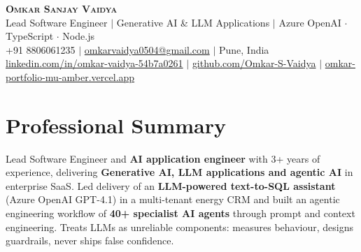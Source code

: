 \documentclass[letterpaper,10pt]{article}
\begin{document}
\begin{center}
\textbf{\Huge \scshape Omkar Sanjay Vaidya} \\ \vspace{2pt}
\large Lead Software Engineer $|$ Generative AI \& LLM Applications $|$ Azure OpenAI $\cdot$ TypeScript $\cdot$ Node.js \\ \vspace{2pt}
\small +91 8806061235 $|$
\href{mailto:omkarvaidya0504@gmail.com}{omkarvaidya0504@gmail.com} $|$
Pune, India \\
\href{https://www.linkedin.com/in/omkar-vaidya-54b7a0261/}{linkedin.com/in/omkar-vaidya-54b7a0261} $|$
\href{https://github.com/Omkar-S-Vaidya}{github.com/Omkar-S-Vaidya} $|$
\href{https://omkar-portfolio-mu-amber.vercel.app/}{omkar-portfolio-mu-amber.vercel.app}
\end{center}

\section{Professional Summary}
\small{Lead Software Engineer and \textbf{AI application engineer} with 3+ years of experience, delivering \textbf{Generative AI, LLM applications and agentic AI} in enterprise SaaS. Led delivery of an \textbf{LLM-powered text-to-SQL assistant} (Azure OpenAI GPT-4.1) in a multi-tenant energy CRM and built an agentic engineering workflow of \textbf{40+ specialist AI agents} through prompt and context engineering. Treats LLMs as unreliable components: measures behaviour, designs guardrails, never ships false confidence.}

\end{document}
